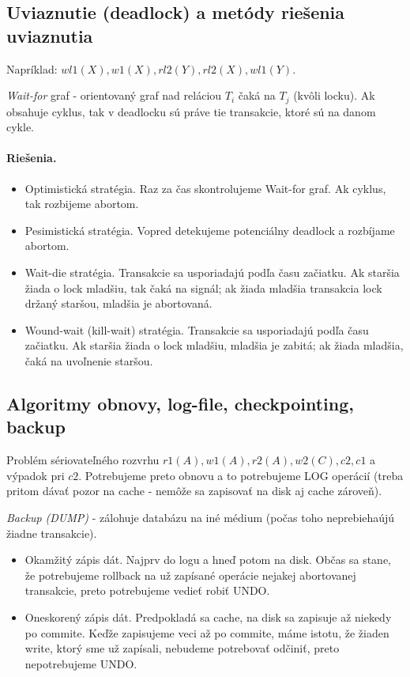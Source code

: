 \documentclass[10pt,a4paper]{article}
\begin{document}
\subsection{Uviaznutie (deadlock) a metódy riešenia uviaznutia}
Napríklad: $wl1(X), w1(X), rl2(Y), rl2(X), wl1(Y)$.

\emph{Wait-for} graf - orientovaný graf nad reláciou $T_i$ čaká na $T_j$ (kvôli locku).
Ak obsahuje cyklus, tak v deadlocku sú práve tie transakcie, ktoré sú na danom cykle. 

\paragraph{Riešenia.}

\begin{itemize}
\item Optimistická stratégia. Raz za čas skontrolujeme Wait-for graf. Ak cyklus, tak rozbijeme abortom. 
\item Pesimistická stratégia. Vopred detekujeme potenciálny deadlock a rozbíjame abortom.  
\item Wait-die stratégia. Transakcie sa usporiadajú podľa času začiatku.
      Ak staršia žiada o lock mladšiu, tak čaká na signál; ak žiada
      mladšia transakcia lock držaný staršou, mladšia je abortovaná.
\item Wound-wait (kill-wait) stratégia. Transakcie sa usporiadajú podľa
      času začiatku. Ak staršia žiada o lock mladšiu, mladšia je
      zabitá; ak žiada mladšia, čaká na uvoľnenie staršou.
\end{itemize}

\subsection{Algoritmy obnovy, log-file, checkpointing, backup}
    
Problém sériovateľného rozvrhu $r1(A), w1(A), r2(A), w2(C), c2, c1$ a výpadok pri $c2$.
Potrebujeme preto obnovu a to potrebujeme LOG operácií (treba pritom dávať pozor na cache - nemôže sa zapisovať na disk aj cache zároveň). 

\emph{Backup (DUMP)} - zálohuje databázu na iné médium (počas toho neprebiehaújú žiadne transakcie). 

\begin{itemize}
\item Okamžitý zápis dát. Najprv do logu a hneď potom na disk. Občas sa
      stane, že potrebujeme rollback na už zapísané operácie nejakej
      abortovanej transakcie, preto potrebujeme vedieť robiť UNDO.
\item Oneskorený zápis dát. Predpokladá sa cache, na disk sa zapisuje až
      niekedy po commite. Keďže zapisujeme veci až po commite, máme
      istotu, že žiaden write, ktorý sme už zapísali, nebudeme potrebovať
      odčiniť, preto nepotrebujeme UNDO.
\end{itemize}
\end{document}
